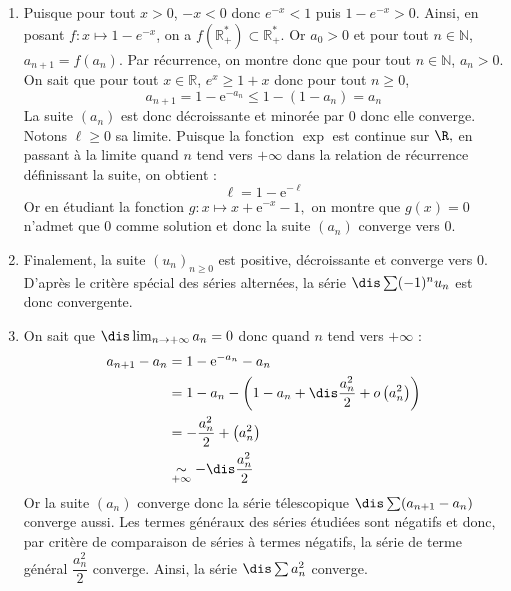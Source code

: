 \documentclass[a4paper,10pt]{report}
\begin{document}
\corr \begin{enumerate}
\item Puisque pour tout $x>0$, $-x<0$ donc $e^{-x}<1$ puis $1-e^{-x}>0$. Ainsi, en posant $f: x \mapsto 1-e^{-x}$, on a $f(\mathbb{R}_+^{*}) \subset \mathbb{R}_+^{*}$. Or $a_0 >0$ et pour tout $n \in \mathbb{N}$, $a_{n+1}=f(a_n)$. Par récurrence, on montre donc que pour tout $n \in \mathbb{N}$, $a_n >0$. On sait que pour tout $x \in \mathbb{R}$, $e^x \geq 1+x$ donc pour tout $n \geq 0$,
 $$a_{n+1}=1- {\mathrm{e}}^{ - a_n } \leq 1-(1-a_n)=a_n$$
La suite $(a_n)$ est donc d\'ecroissante et minorée par $0$ donc elle converge. Notons $\ell\geq 0$ sa limite. Puisque la fonction $\exp$ est continue sur $\R,$ en passant \`a la limite quand $n$ tend vers $+\infty$ dans la relation de récurrence définissant la suite, on obtient :
$$\ell= 1 - {\mathrm{e}}^{ - \ell }$$
Or en \'etudiant la fonction $g : x\longmapsto x+{\mathrm{e}}^{ - x }-1,$ on montre que $g(x)=0$ n'admet que $0$ comme solution et donc la suite $(a_n)$ converge vers $0$.
\item Finalement, la suite $(u_n)_{n \geq 0}$ est positive, décroissante et converge vers $0$. D'après le critère spécial des séries alternées, la série $\dis \sum (-1)^n u_n$ est donc convergente. 
\item On sait que $\dis\lim_{n\to+\infty}a_n=0$ donc quand $n$ tend vers $+ \infty$ :
\begin{align*}
a_{n+1}-a_n & = 1 - {\mathrm{e}}^{ - a_n }-a_n \\
& =1-a_n-\left(1-a_n+\dis\frac{a_n^2}{2} + o \left(a_n^2\right)\right) \\
& = - \dfrac{a_n^2}{2} + \left(a_n^2\right)\\
& \underset{+ \infty}{\sim} -\dis\frac{a_n^2}{2} \\
\end{align*}
Or la suite $(a_n)$ converge donc la s\'erie t\'elescopique $\dis\sum(a_{n+1}-a_n)$ converge aussi. Les termes généraux des séries étudiées sont négatifs et donc, par critère de comparaison de séries à termes négatifs, la s\'erie de terme général $\dfrac{a_n^2}{2}$ converge. Ainsi, la s\'erie $\dis\sum a_n^2$ converge.


\end{enumerate}
\end{document}
